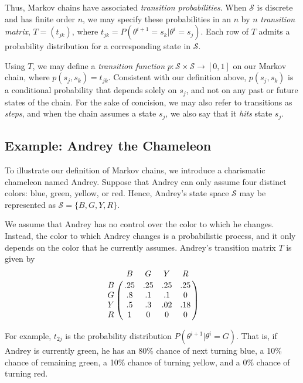 \documentclass[12pt,twoside]{reedthesis}
\begin{document}
			Thus, Markov chains have associated {\em transition probabilities}. When $\mathcal S$ is discrete and has finite order $n$, we may specify these probabilities in an $n$ by $n$ {\em transition matrix}, $T = (t_{jk})$, where $t_{jk} = P(\theta^{i+1} = s_k | \theta^{i} = s_j)$. Each row of $T$ admits a probability distribution for a corresponding state in $\mathcal S$. 
			
			Using $T$, we may define a {\em transition function} $p: \mathcal{S}\times\mathcal{S} \rightarrow [0,1]$ on our Markov chain, where $p(s_j,s_k) = t_{jk}$. Consistent with our definition above, $p(s_j,s_k)$ is a conditional probability that depends solely on $s_j$, and not on any past or future states of the chain. For the sake of concision, we may also refer to transitions as {\em steps}, and when the chain assumes a state $s_j$, we also say that it {\em hits} state $s_j$. 
			
	 
	\subsection*{Example: Andrey the Chameleon}
	To illustrate our definition of Markov chains, we introduce a charismatic chameleon named Andrey. 
	Suppose that Andrey can only assume four distinct colors: blue, green, yellow, or red. Hence, Andrey's state space $\mathcal S$ may be represented as $\mathcal{S} = \{B, G, Y, R\}$. 
	
	We assume that Andrey has no control over the color to which he changes. Instead, the color to which Andrey changes is a probabilistic process, and it only depends on the color that he currently assumes. Andrey's transition matrix $T$ is given by
$$
\bordermatrix{ ~ & B & G & Y & R \cr
	                     B & .25 & .25 & .25 & .25 \cr
	                     G & .8 & .1 & .1 & 0 \cr
	                     Y & .5 & .3 & .02 & .18 \cr
	                     R & 1 & 0 & 0 & 0 \cr	                     	                     	                     
}
$$
	
	For example, $t_{2j}$ is the probability distribution $P(\theta^{i+1} | \theta^i = G)$. That is, if Andrey is currently green, he has an 80\% chance of next turning blue, a 10\% chance of remaining green, a 10\% chance of turning yellow, and a 0\% chance of turning red. 
	
\end{document}
